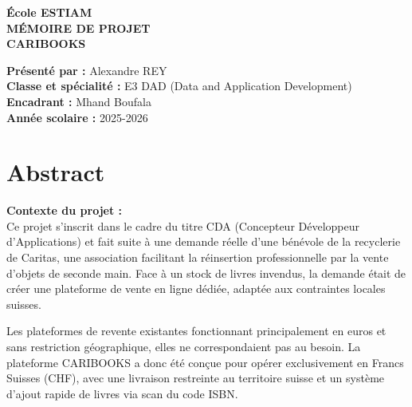 \documentclass[12pt, a4paper]{report}
\renewcommand{\_}{\origunderscore\allowbreak}
\begin{document}
\begin{titlepage}
    \centering
    \vspace*{2cm}
    
    {\Large \textbf{École ESTIAM} }\\[2cm]
    
    {\huge \textbf{MÉMOIRE DE PROJET}}\\[1cm]
    {\Huge \textbf{CARIBOOKS}}\\[2cm]
  
    \begin{flushleft}
        \large
        \textbf{Présenté par :} Alexandre REY \\
        \textbf{Classe et spécialité :} E3 DAD (Data and Application Development) \\[0.5cm]
        \textbf{Encadrant :} Mhand Boufala \\
        \textbf{Année scolaire :} 2025-2026 \\
    \end{flushleft}
    
    \vfill
    \vspace{2cm}
\end{titlepage}

\chapter*{Abstract}

\textbf{Contexte du projet :} \\
Ce projet s'inscrit dans le cadre du titre CDA (Concepteur Développeur d'Applications) et fait suite à une demande réelle d'une bénévole de la recyclerie de Caritas, une association facilitant la réinsertion professionnelle par la vente d'objets de seconde main. Face à un stock de livres invendus, la demande était de créer une plateforme de vente en ligne dédiée, adaptée aux contraintes locales suisses.

Les plateformes de revente existantes fonctionnant principalement en euros et sans restriction géographique, elles ne correspondaient pas au besoin. La plateforme CARIBOOKS a donc été conçue pour opérer exclusivement en Francs Suisses (CHF), avec une livraison restreinte au territoire suisse et un système d'ajout rapide de livres via scan du code ISBN.
\end{document}
